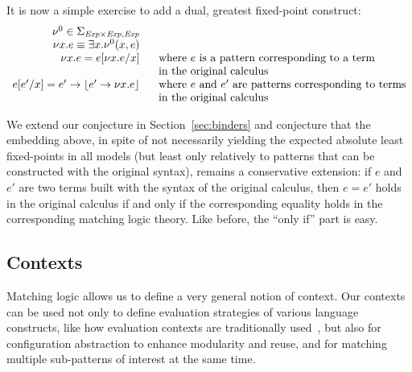 \documentclass[UTF8,11pt]{article}
\theoremstyle{plain}
\theoremstyle{definition}
\theoremstyle{remark}
\DeclarePairedDelimiter{\floor}{\lfloor}{\rfloor}
\newcommand{\Exp}{\textit{Exp}}
\begin{document}
It is now a simple exercise to add a dual, greatest fixed-point construct:
$$
\begin{array}{r@{\hspace*{4ex}}l}
\nu^0 \in \Sigma_{\Exp\times\Exp,\Exp}
\\
\nu x . e \equiv \exists x . \nu^0(x,e)
\\
\nu x . e = e[\nu x.e/x]
& \textrm{where $e$ is a pattern corresponding to a term}
\\
& \textrm{in the original calculus} \\
e[e'/x] = e' \rightarrow \floor{e' \rightarrow \nu x . e}
& \textrm{where $e$ and $e'$ are patterns corresponding to terms}
\\
& \textrm{in the original calculus}
\end{array}
$$


We extend our conjecture in Section~\ref{sec:binders} and conjecture
that the embedding above, in spite of not necessarily yielding the
expected absolute least fixed-points in all models (but least only
relatively to patterns that can be constructed with the original
syntax), remains a conservative extension: if $e$ and $e'$ are two
terms built with the syntax of the original calculus, then $e=e'$
holds in the original calculus if and only if the corresponding equality holds
in the corresponding matching logic theory.
Like before, the ``only if'' part is easy.

\subsection{Contexts}

Matching logic allows us to define a very general notion of context.
Our contexts can be used not only to define evaluation strategies of
various language constructs, like how evaluation contexts are
traditionally used~\cite{felleisen-hieb-92}, but also for configuration
abstraction to enhance modularity and reuse, and for matching multiple
sub-patterns of interest at the same time.
\end{document}
